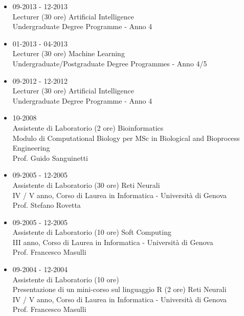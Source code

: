 \documentclass[a4paper,10pt]{article}
\begin{document}
\begin{itemize}
\item 09-2013 - 12-2013 \\
  Lecturer (30 ore)
  Artificial Intelligence \\
  Undergraduate Degree Programme - Anno 4
\item 01-2013 - 04-2013 \\
  Lecturer (30 ore)
  Machine Learning \\
  Undergraduate/Postgraduate Degree Programmes - Anno 4/5
\item 09-2012 - 12-2012 \\
  Lecturer (30 ore)
  Artificial Intelligence \\
  Undergraduate Degree Programme - Anno 4
\item 10-2008 \\
  Assistente di Laboratorio (2 ore)
  Bioinformatics \\
  Modulo di Computational Biology per MSc in Biological and Bioprocess Engineering \\
  Prof. Guido Sanguinetti
\item 09-2005 - 12-2005 \\
  Assistente di Laboratorio (30 ore)
  Reti Neurali \\
  IV / V anno, Corso di Laurea in Informatica - Universit\`a di Genova \\
  Prof. Stefano Rovetta
\item 09-2005 - 12-2005 \\
  Assistente di Laboratorio (10 ore)
  Soft Computing \\
  III anno, Corso di Laurea in Informatica - Universit\`a di Genova \\
  Prof. Francesco Masulli
\item 09-2004 - 12-2004 \\
  Assistente di Laboratorio (10 ore) \\
  Presentazione di un mini-corso sul linguaggio R (2 ore)
  Reti Neurali \\
  IV / V anno, Corso di Laurea in Informatica - Universit\`a di Genova \\
  Prof. Francesco Masulli
\end{itemize}

\end{document}
